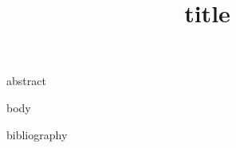 \documentclass[stu]{apa7}
\title{{{title}}}
{{authors_block}}
\begin{document}
\maketitle

{{abstract}}

{{body}}

{{bibliography}}
\end{document}
